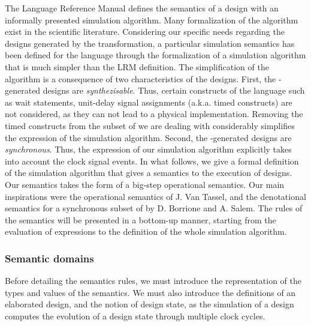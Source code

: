 The \vhdl{} Language Reference Manual\cite{VHDL2000} defines the
semantics of a \vhdl{} design with an informally presented simulation
algorithm.  Many formalization of the algorithm exist in the
scientific
literature\cite{Borger1995,Borrione1995,Breuer1994,Breuer1995,Breuer1995a,Deharbe1995,Dohmen1995,Fuchs1995,Goossens1995,Kloos2012,Olcoz1995,Pandey1999,Reetz1995,Shankar1997,Thirunarayan2001,VanTassel1995}. Considering
our specific needs regarding the \vhdl{} designs generated by the
\hilecop{} transformation, a particular simulation semantics has been
defined for the \hvhdl{} language through the formalization of a
simulation algorithm that is much simpler than the LRM definition.
The simplification of the algorithm is a consequence of two
characteristics of the \hvhdl{} designs. First, the
\hilecop{}-generated \hvhdl{} designs are
\textit{synthezisable}. Thus, certain constructs of the \vhdl{}
language such as wait statements, unit-delay signal assignments
(a.k.a. timed constructs) are not considered, as they can not lead to
a physical implementation. Removing the timed constructs from the
subset of \vhdl{} we are dealing with considerably simplifies the
expression of the simulation algorithm. Second, the
\hilecop{}-generated \hvhdl{} designs are \textit{synchronous}. Thus,
the expression of our simulation algorithm explicitly takes into
account the clock signal events. In what follows, we give a formal
definition of the simulation algorithm that gives a semantics to the
execution of \hvhdl{} designs. Our semantics takes the form of a
big-step operational semantics. Our main inspirations were the
operational semantics of J. Van Tassel\cite{VanTassel1995}, and the
denotational semantics for a synchronous subset of \vhdl{} by
D. Borrione and A. Salem\cite{Borrione1995}. The rules of the
semantics will be presented in a bottom-up manner, starting from the
evaluation of expressions to the definition of the whole simulation
algorithm.

\subsubsection{Semantic domains}
\label{subsubsec:sem-domains}

Before detailing the semantics rules, we must introduce the
representation of the types and values of the semantics. We must also
introduce the definitions of an elaborated design, and the notion of
design state, as the simulation of a design computes the evolution of
a design state through multiple clock cycles.

